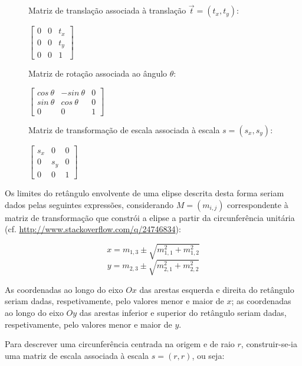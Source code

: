 \documentclass[a4paper]{article}
\begin{document}
\begin{figure}[ht]

	\centering

	Matriz de translação associada à translação \(\vec{t} = (t_x, t_y)\):

	\medskip

	\(
	\begin{bmatrix}
		0 & 0 & t_x \\
		0 & 0 & t_y \\
		0 & 0 &   1
	\end{bmatrix}
	\)

	\bigskip

	Matriz de rotação associada ao ângulo \(\theta\):

	\medskip

	\(
	\begin{bmatrix}
		cos\ \theta & -sin\ \theta & 0 \\
		sin\ \theta &  cos\ \theta & 0 \\
		          0 &            0 & 1
	 \end{bmatrix}
	\)

	\bigskip

	Matriz de transformação de escala associada à escala \(s = (s_x, s_y)\):

	\medskip

	\(
	\begin{bmatrix}
		s_x &   0 & 0 \\
		0   & s_y & 0 \\
		0   &   0 & 1
	 \end{bmatrix}
	\)

\end{figure}

Os limites do retângulo envolvente de uma elipse descrita desta forma seriam dados pelas seguintes expressões, considerando \(M = (m_{i,j})\) correspondente à matriz de transformação que constrói a elipse a partir da circunferência unitária (cf. \url{http://www.stackoverflow.com/q/24746834}):

\[ x = m_{1,3} \pm \sqrt{m_{1,1}^2 + m_{1,2}^2} \]
\[ y = m_{2,3} \pm \sqrt{m_{2,1}^2 + m_{2,2}^2} \]

As coordenadas ao longo do eixo \(Ox\) das arestas esquerda e direita do retângulo seriam dadas, respetivamente, pelo valores menor e maior de \(x\); as coordenadas ao longo do eixo \(Oy\) das arestas inferior e superior do retângulo seriam dadas, respetivamente, pelo valores menor e maior de \(y\).

Para descrever uma circunferência centrada na origem e de raio \(r\), construir-se-ia uma matriz de escala associada à escala \(s = (r,r)\), ou seja:
\end{document}
